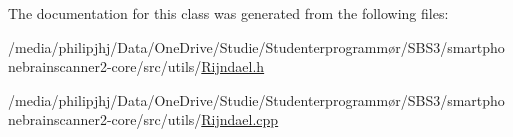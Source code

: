 The documentation for this class was generated from the following files\-:\begin{DoxyCompactItemize}
\item 
/media/philipjhj/\-Data/\-One\-Drive/\-Studie/\-Studenterprogrammør/\-S\-B\-S3/smartphonebrainscanner2-\/core/src/utils/\hyperlink{Rijndael_8h}{Rijndael.\-h}\item 
/media/philipjhj/\-Data/\-One\-Drive/\-Studie/\-Studenterprogrammør/\-S\-B\-S3/smartphonebrainscanner2-\/core/src/utils/\hyperlink{Rijndael_8cpp}{Rijndael.\-cpp}\end{DoxyCompactItemize}
